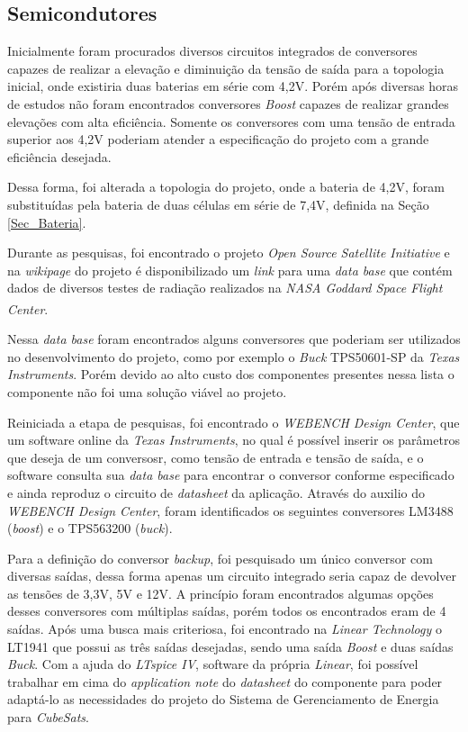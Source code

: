 \documentclass[
	12pt,				%
	openright,			%
	oneside,			%
	a4paper,			%
	english,			%
	french,				%
	spanish,			%
	brazil,				%
	oldfontcommands
	]{abntex2}
\begin{document}
\subsection[Semicondutores]{Semicondutores}

	Inicialmente foram procurados diversos circuitos integrados de conversores capazes de realizar a elevação e diminuição da tensão de saída para a topologia inicial, onde existiria duas baterias em série com 4,2V. Porém após diversas horas de estudos não foram encontrados conversores \textit{Boost} capazes de realizar grandes elevações com alta eficiência. Somente os conversores com uma tensão de entrada superior aos 4,2V poderiam atender a especificação do projeto com a grande eficiência desejada.
	
	Dessa forma, foi alterada a topologia do projeto, onde a bateria de 4,2V, foram substituídas pela bateria de duas células em série de 7,4V, definida na Seção \ref{Sec_Bateria}.
	
	Durante as pesquisas, foi encontrado o projeto \textit{Open Source Satellite Initiative} e na \textit{wikipage} do projeto é disponibilizado um \textit{link} para uma \textit{data base} que contém dados de diversos testes de radiação realizados na \textit{NASA Goddard Space Flight Center}.\textsuperscript{\cite{OSSI}}\textsuperscript{\cite{OSSI2}}\textsuperscript{\cite{OSSI3}}
	
	Nessa \textit{data base} foram encontrados alguns conversores que poderiam ser utilizados no desenvolvimento do projeto, como por exemplo o \textit{Buck} TPS50601-SP da \textit{Texas Instruments}. Porém devido ao alto custo dos componentes presentes nessa lista o componente não foi uma solução viável ao projeto.
	
	Reiniciada a etapa de pesquisas, foi encontrado o \textit{WEBENCH Design Center}, que um software online da \textit{Texas Instruments}, no qual é possível inserir os parâmetros que deseja de um conversosr, como tensão de entrada e tensão de saída, e o software consulta sua \textit{data base} para encontrar o conversor conforme especificado e ainda reproduz o circuito de \textit{datasheet} da aplicação. Através do auxilio do \textit{WEBENCH Design Center}, foram identificados os seguintes conversores LM3488 (\textit{boost}) e o TPS563200 (\textit{buck}).
	
	Para a definição do conversor \textit{backup}, foi pesquisado um único conversor com diversas saídas, dessa forma apenas um circuito integrado seria capaz de devolver as tensões de 3,3V, 5V e 12V. A princípio foram encontrados algumas opções desses conversores com múltiplas saídas, porém todos os encontrados eram de 4 saídas. Após uma busca mais criteriosa, foi encontrado na \textit{Linear Technology} o LT1941 que possui as três saídas desejadas, sendo uma saída \textit{Boost} e duas saídas \textit{Buck}. Com a ajuda do \textit{LTspice IV}, software da própria \textit{Linear}, foi possível trabalhar em cima do \textit{application note} do \textit{datasheet} do componente para poder adaptá-lo as necessidades do projeto do Sistema de Gerenciamento de Energia para \textit{CubeSats}.
\end{document}
